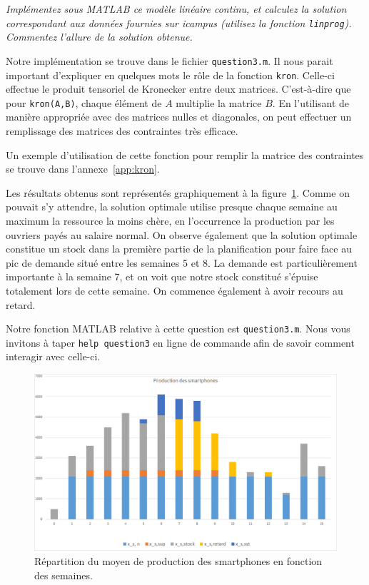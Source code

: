\question %
\emph{Implémentez sous MATLAB ce modèle linéaire continu,
et calculez la solution correspondant aux données fournies sur icampus
(utilisez la fonction \texttt{linprog}).
Commentez l'allure de la solution obtenue.}

Notre implémentation se trouve dans le fichier \texttt{question3.m}.
Il nous parait important d'expliquer en quelques mots le r\^ole
de la fonction \texttt{kron}.
Celle-ci effectue le produit tensoriel de Kronecker entre deux matrices.
C'est-à-dire que pour \texttt{kron(A,B)},
chaque élément de $A$ multiplie la matrice $B$.
En l'utilisant de manière appropriée avec des matrices nulles et diagonales,
on peut effectuer un remplissage des matrices des contraintes très efficace.

Un exemple d'utilisation de cette fonction pour remplir la matrice
des contraintes se trouve dans l'annexe~\ref{app:kron}.

Les résultats obtenus sont représentés graphiquement
à la figure~\ref{fig:grapheProduction}.
Comme on pouvait s'y attendre, la solution optimale utilise presque chaque
semaine au maximum la ressource la moins chère,
en l'occurrence la production par les ouvriers payés au salaire normal.
On observe également que la solution optimale constitue un stock dans la première partie de la planification pour faire face au pic de demande
situé entre les semaines 5 et 8.
La demande est particulièrement importante à la semaine 7,
et on voit que notre stock constitué s'épuise totalement lors de cette semaine.
On commence également à avoir recours au retard.

Notre fonction MATLAB relative à cette question est \texttt{question3.m}. Nous vous invitons à taper \texttt{help question3} en ligne de commande afin de savoir comment interagir avec celle-ci.

\begin{figure}[H]
  \begin{center}
    \includegraphics[scale = 0.8]{img/grapheProduction.png}
	  \caption{Répartition du moyen de production des smartphones en fonction des semaines.}
	  \label{fig:grapheProduction}
  \end{center}
\end{figure}
